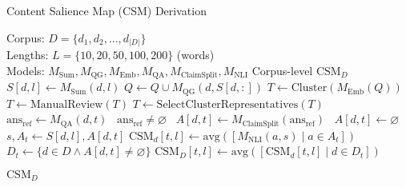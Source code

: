 \setlength{\textfloatsep}{0.7em}
\algrenewcommand{}
\algrenewcommand{}
\begin{algorithm}[t]
\captionsetup{font=10pt}
\footnotesize
\caption{Content Salience Map (CSM) Derivation}\label{alg:csm-derivation}
\begin{algorithmic}[1]
\Require Corpus: $D = \{d_1, d_2, ..., d_{|D|}\}$\\
         Lengths: $L = \{10, 20, 50, 100, 200\}$ (words)\\
         Models: $M_{\text{Sum}}, M_{\text{QG}}, M_{\text{Emb}}, M_{\text{QA}}, M_{\text{ClaimSplit}}, M_{\text{NLI}}$
\Ensure Corpus-level $\text{CSM}_D$ %
 
    \State $S[d,l] \gets M_{\text{Sum}}(d, l)$
\EndFor
\Statex \vspace{-0.5em}
 
    \State $Q \gets Q \cup M_{\text{QG}}(d, S[d,:])$
\EndFor
\Statex \vspace{-0.4em}
\State $T \gets \text{Cluster}(M_{\text{Emb}}(Q))$ 
\State $T \gets \text{ManualReview}(T)$
\State $T \gets \text{SelectClusterRepresentatives}(T)$\\[-5pt]
 
\State $\text{ans}_{\text{ref}} \gets M_{\text{QA}}(d, t)$
\State \algorithmicif\ $\text{ans}_{\text{ref}} \neq \varnothing$ \algorithmicthen\ $A[d,t] \gets M_{\text{ClaimSplit}}(\text{ans}_{\text{ref}})$
    \State \algorithmicelse\ $A[d,t] \gets \varnothing$
\EndFor
\Statex \vspace{-0.5em}
 
        \State $s, A_t \gets S[d,l], A[d,t]$ 
        \State $\text{CSM}_d[t,l] \gets \text{avg}([M_{\text{NLI}}(a,s) \mid a \in A_t ])$ 
    \EndFor
    \State $D_t \gets \{d \in D \land A[d,t] \neq \varnothing\}$
    \State $\text{CSM}_D[t,l] \gets \text{avg}([\text{CSM}_d[t,l] \mid d \in D_t])$ 
\EndFor

\State \Return $\text{CSM}_D$
\end{algorithmic}
\end{algorithm}
